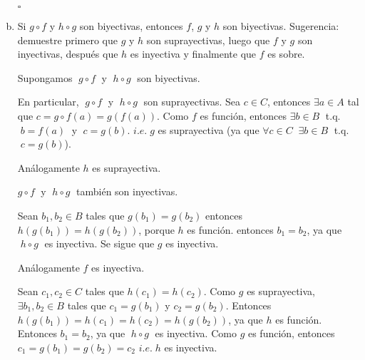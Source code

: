 \documentclass[letterpaper,11pt]{article}
\begin{document}
\begin{adjustwidth}{1cm}{0cm}
\begin{enumerate}[(a)]
        \begin{flushright}
          $\square$
        \end{flushright}


      \item Si $g \circ f$ y $h \circ g$ son biyectivas, entonces $f$, $g$ y $h$
        son biyectivas. Sugerencia: demuestre primero que $g$ y $h$ son suprayectivas,
        luego que $f$ y $g$ son inyectivas, después que $h$ es inyectiva y finalmente
        que $f$ es sobre. \newline

        Supongamos $\; g \circ f \;$ y $\; h \circ g \;$ son biyectivas. \newline

        En particular, $\; g \circ f \;$ y $\; h \circ g \;$ son suprayectivas. \newline
        Sea $c \in C$, entonces $\exists a \in A$ tal que $c = g \circ f (a) = g(f(a))$. \newline
        Como $f$ es función, entonces $\exists b \in B \;$ t.q. $\; b = f(a) \;$ y $\; c = g(b)$. \newline
        $i.e. \; g$ es suprayectiva (ya que $\forall c \in C \;\; \exists b \in B \;$ t.q. $\; c = g(b)$). \newline

        Análogamente $h$ es suprayectiva. \newline

        $g \circ f \;$ y $\; h \circ g \;$ también son inyectivas. \newline

        Sean $b_1, b_2 \in B$ tales que $g(b_1) = g(b_2)$ \newline
        entonces $h(g(b_1)) = h(g(b_2))$, porque $h$ es función. \newline
        entonces $b_1 = b_2$, ya que $\; h \circ g \;$ es inyectiva. \newline
        Se sigue que $g$ es inyectiva. \newline

        Análogamente $f$ es inyectiva. \newline

        Sean $c_1, c_2 \in C$ tales que $h(c_1) = h(c_2)$. \newline
        Como $g$ es suprayectiva, $\exists b_1, b_2 \in B$ tales que $c_1 = g(b_1)$ y $c_2 = g(b_2)$. \newline
        Entonces $h(g(b_1)) = h(c_1) = h(c_2) = h(g(b_2))$, ya que $h$ es función. \newline
        Entonces $b_1 = b_2$, ya que $\; h \circ g \;$ es inyectiva. \newline
        Como $g$ es función, entonces $c_1 = g(b_1) = g(b_2) = c_2$ \newline
        $i.e. \; h$ es inyectiva. \newline


\end{enumerate}
\end{adjustwidth}
\end{document}
